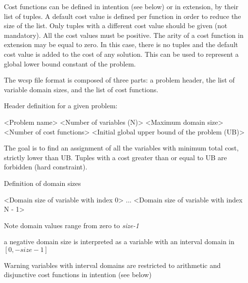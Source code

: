 \documentclass{article}
\begin{document}
Cost functions can be defined in intention (see below) or in extension, by their list of tuples. A default cost value is defined per function in order to reduce the size of the list. Only tuples with a different cost value should be given (not mandatory). All the cost values must be positive. The arity of a cost function in extension may be equal to zero. In this case, there is no tuples and the default cost value is added to the cost of any solution. This can be used to represent a global lower bound constant of the problem.

The wcsp file format is composed of three parts\-: a problem header, the list of variable domain sizes, and the list of cost functions.


\begin{DoxyItemize}
\item Header definition for a given problem\-: \begin{DoxyVerb}<Problem name>
<Number of variables (N)>
<Maximum domain size>
<Number of cost functions>
<Initial global upper bound of the problem (UB)>
\end{DoxyVerb}
 The goal is to find an assignment of all the variables with minimum total cost, strictly lower than U\-B. Tuples with a cost greater than or equal to U\-B are forbidden (hard constraint).
\item Definition of domain sizes \begin{DoxyVerb}<Domain size of variable with index 0>
...
<Domain size of variable with index N - 1>
\end{DoxyVerb}
 \begin{DoxyNote}{Note}
domain values range from zero to {\itshape size-\/1} 

a negative domain size is interpreted as a variable with an interval domain in $[0,-size-1]$ 
\end{DoxyNote}
\begin{DoxyWarning}{Warning}
variables with interval domains are restricted to arithmetic and disjunctive cost functions in intention (see below)
\end{DoxyWarning}


\end{DoxyItemize}
\end{document}
